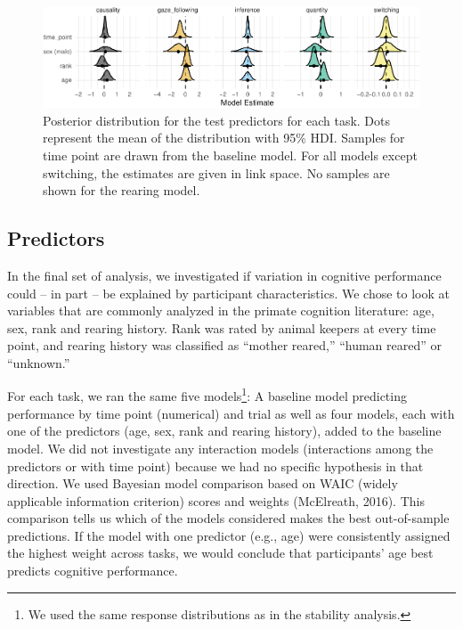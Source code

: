 \documentclass[10pt, letterpaper]{article}
\newenvironment{CodeChunk}{}{}
\begin{document}
\begin{CodeChunk}
\begin{figure}[h]

{\centering \includegraphics{figs/predplot-1} 

}

\caption[Posterior distribution for the test predictors for each task]{Posterior distribution for the test predictors for each task. Dots represent the mean of the distribution with 95\% HDI. Samples for time point are drawn from the baseline model. For all models except switching, the estimates are given in link space. No samples are shown for the rearing model.}\label{fig:predplot}
\end{figure}
\end{CodeChunk}

\hypertarget{predictors}{%
\subsection{Predictors}\label{predictors}}

In the final set of analysis, we investigated if variation in cognitive
performance could -- in part -- be explained by participant
characteristics. We chose to look at variables that are commonly
analyzed in the primate cognition literature: age, sex, rank and rearing
history. Rank was rated by animal keepers at every time point, and
rearing history was classified as ``mother reared,'' ``human reared'' or
``unknown.''

For each task, we ran the same five models\footnote{We used the same
  response distributions as in the stability analysis.}: A baseline
model predicting performance by time point (numerical) and trial as well
as four models, each with one of the predictors (age, sex, rank and
rearing history), added to the baseline model. We did not investigate
any interaction models (interactions among the predictors or with time
point) because we had no specific hypothesis in that direction. We used
Bayesian model comparison based on WAIC (widely applicable information
criterion) scores and weights (McElreath, 2016). This comparison tells
us which of the models considered makes the best out-of-sample
predictions. If the model with one predictor (e.g., age) were
consistently assigned the highest weight across tasks, we would conclude
that participants' age best predicts cognitive performance.
\end{document}
